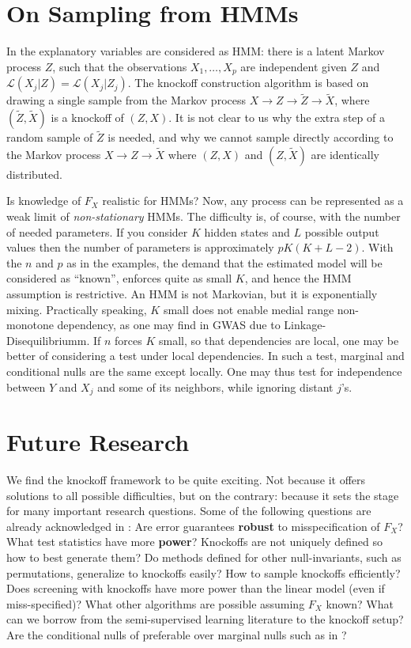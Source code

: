 \documentclass[article,lineno]{biometrika}
\begin{document}
	
	\section{On Sampling from HMMs}
	In \cite{SesiaGenehuntinghidden} the explanatory variables are considered as HMM: there is a latent Markov process $Z$, such that the observations $X_1,\dots,X_p$ are independent given $Z$ and ${\mathcal L}(X_j|Z)={\mathcal L}(X_j|Z_j)$.
	The knockoff construction algorithm is based on drawing a single sample from the Markov process $X\to Z\to \tilde Z\to \tilde X$, where $(\tilde Z,\tilde X)$ is a knockoff of $(Z,X)$.
	It is not clear to us why the extra step of a random sample of $\tilde Z$ is needed, and why we cannot sample directly according to the Markov process $X\to Z\to \tilde X$ where $(Z,X)$ and $(Z,\tilde X)$ are identically distributed.
	
	Is knowledge of $F_X$ realistic for HMMs?
	Now, any process can be  represented as a weak limit of \emph{non-stationary} HMMs.
	The difficulty is, of course, with the number of needed parameters.
	If you consider $K$ hidden states and $L$ possible output values then the number of parameters is approximately $pK(K+L-2)$.
	With the $n$ and $p$ as in the examples, the demand that the estimated model will be considered as ``known'', enforces quite as small $K$, and hence the HMM assumption is restrictive.
	An HMM is not Markovian, but it is exponentially mixing.
	Practically speaking, $K$ small does not enable medial range non-monotone dependency, as one may find in GWAS due to Linkage-Disequilibriumm.
	If $n$ forces $K$ small, so that dependencies are local, one may be better of considering a test under local dependencies.
	In such a test, marginal and conditional nulls are the same except locally.
	One may thus test for independence between $Y$ and $X_j$ and some of its neighbors, while ignoring distant $j$'s.
	
	
	
	
	\section{Future Research}
	
	We find the knockoff framework to be quite exciting.
	Not because it offers solutions to all possible difficulties, but on the contrary: because it sets the stage for many important research questions.
	Some of the following questions are already acknowledged in \citet[Sec.7.2]{CandesPanninggoldmodelX2018}:
	Are error guarantees \textbf{robust} to misspecification of $F_X$?
	What test statistics have more \textbf{power}?
	Knockoffs are not uniquely defined so how to best generate them?
	Do methods defined for other null-invariants, such as permutations, generalize to knockoffs easily?
	How to sample knockoffs efficiently?
	Does screening with knockoffs have more power than the linear model (even if miss-specified)?
	What other algorithms are possible assuming $F_X$ known?
	What can we borrow from the semi-supervised learning literature to the knockoff setup?
	Are the conditional nulls of \cite{SesiaGenehuntinghidden} preferable over marginal nulls such as in \cite{TusherSignificanceanalysismicroarrays2001}?
	
\end{document}

